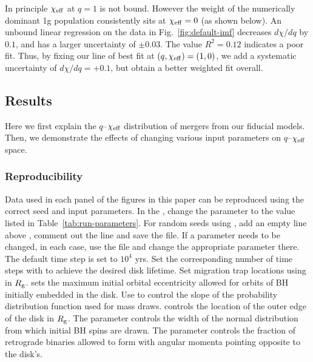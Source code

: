 In principle $\chi_{\rm eff}$ at $q=1$ is not bound.
However the weight of the numerically dominant 1g population consistently sits at $\chi_{\rm eff}=0$ (as shown below).
An unbound linear regression on the data in Fig.~\ref{fig:default-imf} decreases $d\chi/dq$ by $0.1$, and has a larger uncertainty of $\pm0.03$.
The value $R^2=0.12$ indicates a poor fit.
Thus, by fixing our line of best fit at $(q,\chi_{\rm eff})=(1,0)$, we add a systematic uncertainty of $d\chi/dq=+0.1$, but obtain a better weighted fit overall.


\subsection{Results}
\label{sec:results-qxeff}
Here we first explain the $q$--$\chi_{\rm eff}$ distribution of mergers from our fiducial models.
Then, we demonstrate the effects of changing various input parameters on $q$--$\chi_{\rm eff}$ space.

\subsubsection{Reproducibility}
Data used in each panel of the figures in this paper can be reproduced using the correct seed and input parameters.
In the , change the  parameter to the value listed in Table~\ref{tab:run-parameters}.
For random seeds using , add an empty line above , comment out the  line and save the file.
If a parameter needs to be changed, in each case, use the  file and change the appropriate parameter there.
The default time step is set to $10^4$ yrs.
Set the corresponding number of time steps with  to achieve the desired disk lifetime.
Set migration trap locations using  in $R_{\rm g}$.
 sets the maximum initial orbital eccentricity allowed for orbits of BH initially embedded in the disk.
Use  to control the slope of the probability distribution function used for mass draws.
 controls the location of the outer edge of the disk in $R_{\rm g}$.
The parameter  controls the width of the normal distribution from which initial BH spins are drawn.
The parameter  controls the fraction of retrograde binaries allowed to form with angular momenta pointing opposite to the disk's.

